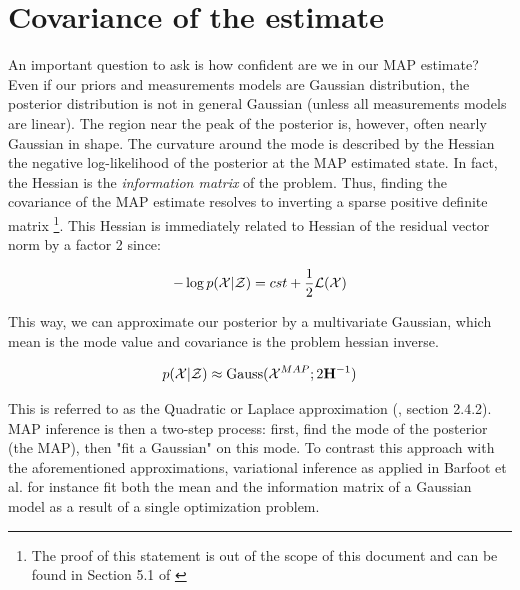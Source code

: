 


\section{Covariance of the estimate}

An important question to ask is how confident are we in our MAP estimate? Even if our priors and measurements models are Gaussian distribution, the posterior distribution
is not in general Gaussian (unless all measurements models are linear). The region near the peak of the posterior is, however, often nearly Gaussian in shape.
The curvature around the mode is described by the Hessian the negative log-likelihood of the posterior at the MAP estimated state. 
In fact, the Hessian is the \textit{information matrix} of the problem. Thus, finding the covariance of the MAP estimate resolves to inverting a 
sparse positive definite matrix \footnote{The proof of this statement is out of the scope of this document and can be found in Section 5.1 of 
\cite{peng2018advanced}}. This Hessian is immediately related to Hessian of the residual vector norm by a factor 2 since:

\begin{equation*}
    -\log p(\mathcal{X}|\mathcal{Z}) = cst + \frac{1}{2}\mathcal{L}(\mathcal{X})
\end{equation*}

This way, we can approximate our posterior by a multivariate Gaussian, which mean is the mode value and covariance 
is the problem hessian inverse. 

\begin{equation}
    p(\mathcal{X} | \mathcal{Z}) \approx \text{Gauss}(\mathcal{X}^{MAP}; 2{\bf H}^{-1})
    \label{eq:map_laplace}
\end{equation}

This is referred to as the Quadratic or Laplace approximation (\cite{mcelreath2018statistical}, section 2.4.2). MAP inference is then a two-step process: 
first, find the mode of the posterior (the MAP), then "fit a Gaussian" on this mode. 
To contrast this approach with the aforementioned approximations, variational inference as applied in Barfoot et al. 
 \cite{barfoot2020exactly} for instance fit both the mean and the information matrix of a Gaussian model as a result of a single optimization problem.


